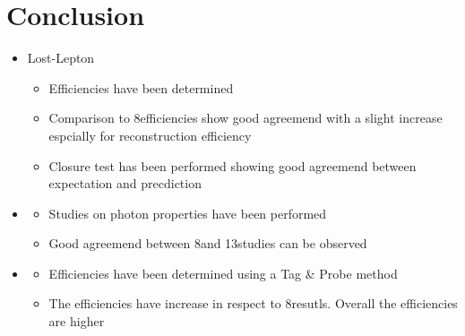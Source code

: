 \documentclass{beamer}
\begin{document}
\section{Conclusion}
\begin{frame}

\begin{itemize}
 \item Lost-Lepton
 \begin{itemize}
  \item Efficiencies have been determined
  \item Comparison to 8\tev efficiencies show good agreemend with a slight increase espcially for reconstruction efficiency
  \item Closure test has been performed showing good agreemend between expectation and precdiction
 \end{itemize}
  \item \photonJets
 \begin{itemize}
  \item Studies on photon properties have been performed 
  \item Good agreemend between 8\tev and 13\tev studies can be observed
 \end{itemize}
 \item \Zll
 \begin{itemize}
  \item Efficiencies have been determined using a Tag \& Probe method
  \item The efficiencies have increase in respect to 8\tev resutls. Overall the efficiencies are higher
 \end{itemize}
\end{itemize}


\end{frame}

\setcounter{framenumber}{15}
\end{document}
